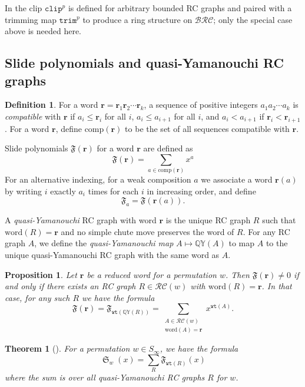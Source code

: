 \documentclass{amsart}
\newtheorem{proposition}[lemma]{Proposition}
\newtheorem{theorem}{Theorem}[section]
\theoremstyle{definition}
\newtheorem{definition}[lemma]{Definition}
\theoremstyle{remark}
\numberwithin{equation}{subsection}
\DeclareMathOperator{\sch}{\mathfrak{S}}
\newcommand{\wtt}{\mathtt{wt}}
\newcommand{\QY}{\ensuremath{\mathbb{QY}}}
\newcommand{\trm}{\mathtt{trim}}
\newcommand{\clp}{\mathtt{clip}}
\newcommand{\BRC}{\mathcal{BRC}}
\newcommand{\RC}{\mathcal{RC}}
\begin{document}
In \cite{companionbialgebra} the clip $\clp^p$ is defined for arbitrary bounded RC graphs and paired with a trimming map $\trm^p$ to produce a ring structure on $\BRC$; only the special case above is needed here.

\subsection{Slide polynomials and quasi-Yamanouchi RC graphs}

\begin{definition}
For a word $\mathbf{r}=\mathbf{r}_1\mathbf{r}_2\cdots \mathbf{r}_k$, a sequence of positive integers $a_1a_2\cdots a_k$ is \emph{compatible} with $\mathbf{r}$ if $a_i\leq \mathbf{r}_i$ for all $i$, $a_i\leq a_{i+1}$ for all $i$, and $a_i<a_{i+1}$ if $\mathbf{r}_i<\mathbf{r}_{i+1}$. For a word $\mathbf{r}$, define $\mathrm{comp}(\mathbf{r})$ to be the set of all sequences compatible with $\mathbf{r}$.

Slide polynomials $\mathfrak{F}(\mathbf{r})$ for a word $\mathbf{r}$ are defined as 
$$\mathfrak{F}(\mathbf{r}) = \sum_{a\in \mathrm{comp}(\mathbf{r})} x^a$$
For an alternative indexing, for a weak composition $a$ we associate a word $\mathbf{r}(a)$ by writing $i$ exactly $a_i$ times for each $i$ in increasing order, and define 
$$\mathfrak{F}_a = \mathfrak{F}(\mathbf{r}(a)).$$

A \emph{quasi-Yamanouchi} RC graph with word $\mathbf{r}$ is the unique RC graph $R$ such that $\mathrm{word}(R)=\mathbf{r}$ and no simple chute move preserves the word of $R$. For any RC graph $A$, we define the \emph{quasi-Yamanouchi map} $A\mapsto\QY(A)$ to map $A$ to the unique quasi-Yamanouchi RC graph with the same word as $A$.
\end{definition}

\begin{proposition} \label{proposition:sliderc}
Let $\mathbf{r}$ be a reduced word for a permutation $w$. Then $\mathfrak{F}(\mathbf{r})\neq 0$ if and only if there exists an RC graph $R\in \RC(w)$ with $\mathrm{word}(R)=\mathbf{r}$. In that case, for any such $R$ we have the formula
$$\mathfrak{F}(\mathbf{r}) = \mathfrak{F}_{\wtt(\QY(R))} = \sum_{\substack{A\in\RC(w)\\\mathrm{word}(A)=\mathbf{r}}}x^{\wtt(A)}.$$
\end{proposition}

\begin{theorem}[{\cite[Theorem~3.13]{assaf2017slide}}]\label{theorem:assafsearles}
  For a permutation $w\in S_\infty$, we have the formula
  $$\sch_w(x) = \sum_{R} \mathfrak{F}_{\wtt(R)}(x)$$
  where the sum is over all quasi-Yamanouchi RC graphs $R$ for $w$.
\end{theorem}
\end{document}
